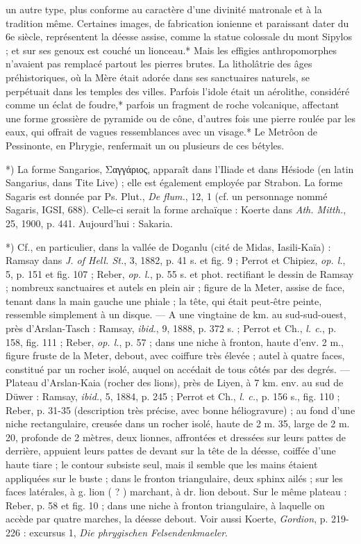 \documentclass[a4paper, 11pt, oneside, polutonikogreek, french]{article}
\begin{document}
un autre type, plus conforme au caractère d'une divinité matronale et à la tradition même. Certaines images, de fabrication ionienne et paraissant dater du 6e siècle, représentent la déesse assise, comme la statue colossale du mont Sipylos ; et sur ses genoux est couché un lionceau.* Mais les effigies anthropomorphes n'avaient pas remplacé partout les pierres brutes. La litholâtrie des âges préhistoriques, où la Mère était adorée dans ses sanctuaires naturels, se perpétuait dans les temples des villes. Parfois l'idole était un aérolithe, considéré comme un éclat de foudre,* parfois un fragment de roche volcanique, affectant une forme grossière de pyramide ou de cône, d'autres fois une pierre roulée par les eaux, qui offrait de vagues ressemblances avec un visage.* Le Metrôon de Pessinonte, en Phrygie, renfermait un ou plusieurs de ces bétyles.

*) La forme Sangarios, Σαγγάριος, apparaît dans l'Iliade et dans Hésiode (en latin Sangarius, dans Tite Live) ; elle est également employée par Strabon. La forme Sagaris est donnée par Ps. Plut., \emph{De flum.}, 12, 1 (cf. un personnage nommé Sagaris, IGSI, 688). Celle-ci serait la forme archaïque : Koerte dans \emph{Ath. Mitth.}, 25, 1900, p. 441. Aujourd'hui : Sakaria.

*) Cf., en particulier, dans la vallée de Doganlu (cité de Midas, Iasili-Kaïa) : Ramsay dans \emph{J. of Hell. St.}, 3, 1882, p. 41 s. et fig. 9 ; Perrot et Chipiez, \emph{op. l.}, 5, p. 151 et fig. 107 ; Reber, \emph{op. l.}, p. 55 s. et phot. rectifiant le dessin de Ramsay ; nombreux sanctuaires et autels en plein air ; figure de la Meter, assise de face, tenant dans la main gauche une phiale ; la tête, qui était peut-être peinte, ressemble simplement à un disque. --- A une vingtaine de km. au sud-sud-ouest, près d'Arslan-Tasch : Ramsay, \emph{ibid.}, 9, 1888, p. 372 s. ; Perrot et Ch., \emph{l. c.}, p. 158, fig. 111 ; Reber, \emph{op. l.}, p. 57 ; dans une niche à fronton, haute d'env. 2 m., figure fruste de la Meter, debout, avec coiffure très élevée ; autel à quatre faces, constitué par un rocher isolé, auquel on accédait de tous côtés par des degrés. --- Plateau d'Arslan-Kaia (rocher des lions), près de Liyen, à 7 km. env. au sud de Düwer : Ramsay, \emph{ibid.}, 5, 1884, p. 245 ; Perrot et Ch., \emph{l. c.}, p. 156 s., fig. 110 ; Reber, p. 31-35 (description très précise, avec bonne héliogravure) ; au fond d'une niche rectangulaire, creusée dans un rocher isolé, haute de 2 m. 35, large de 2 m. 20, profonde de 2 mètres, deux lionnes, affrontées et dressées sur leurs pattes de derrière, appuient leurs pattes de devant sur la tête de la déesse, coiffée d'une haute tiare ; le contour subsiste seul, mais il semble que les mains étaient appliquées sur le buste ; dans le fronton triangulaire, deux sphinx ailés ; sur les faces latérales, à g. lion ( ? ) marchant, à dr. lion debout. Sur le même plateau : Reber, p. 58 et fig. 10 ; dans une niche à fronton triangulaire, à laquelle on accède par quatre marches, la déesse debout. Voir aussi Koerte, \emph{Gordion}, p. 219-226 : excursus 1, \emph{Die phrygischen Felsendenkmaeler}.
\end{document}

